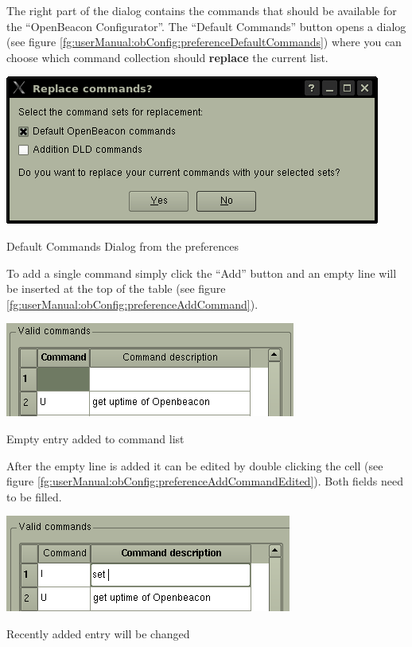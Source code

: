    The right part of the dialog contains the commands that should be available for the ``OpenBeacon Configurator''. The ``Default Commands'' button opens a dialog (see figure \ref{fg:userManual:obConfig:preferenceDefaultCommands}) where you can choose which command collection should \textbf{replace} the current list.
   \begin{staticFigure}
    \begin{center}
     \includegraphics{images/UserManual/obConfig/preferenceWindow-defaultCommands.png}
     \caption{Default Commands Dialog from the preferences}
     \label{fg:userManual:obConfig:preferenceDefaultCommands}
    \end{center}
   \end{staticFigure}
   To add a single command simply click the ``Add'' button and an empty line will be inserted at the top of the table (see figure \ref{fg:userManual:obConfig:preferenceAddCommand}).
   \begin{staticFigure}
    \begin{center}
     \includegraphics{images/UserManual/obConfig/preferenceWindow-cmdAdd.png}
     \caption{Empty entry added to command list}
     \label{fg:userManual:obConfig:preferenceAddCommand}
    \end{center}
   \end{staticFigure}
   After the empty line is added it can be edited by double clicking the cell (see figure \ref{fg:userManual:obConfig:preferenceAddCommandEdited}). Both fields need to be filled.
   \begin{staticFigure}
    \begin{center}
     \includegraphics{images/UserManual/obConfig/preferenceWindow-cmdAddEdit.png}
     \caption{Recently added entry will be changed}
     \label{fg:userManual:obConfig:preferenceAddCommandEdited}
    \end{center}
   \end{staticFigure}

